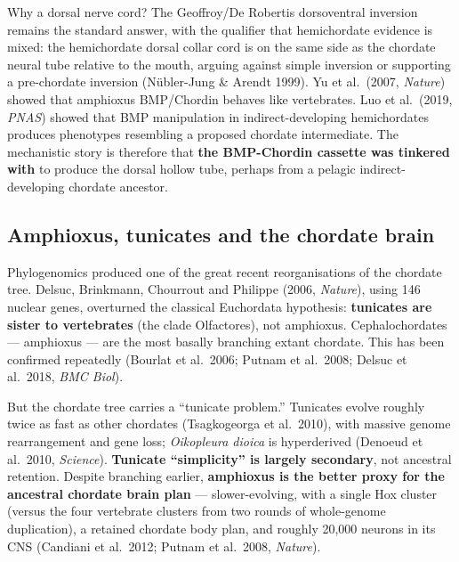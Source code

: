 Why a dorsal nerve cord? The Geoffroy/De Robertis dorsoventral inversion remains the standard answer, with the qualifier that hemichordate evidence is mixed: the hemichordate dorsal collar cord is on the same side as the chordate neural tube relative to the mouth, arguing against simple inversion or supporting a pre-chordate inversion (Nübler-Jung \& Arendt 1999). Yu et al.~(2007, \emph{Nature}) showed that amphioxus BMP/Chordin behaves like vertebrates. Luo et al.~(2019, \emph{PNAS}) showed that BMP manipulation in indirect-developing hemichordates produces phenotypes resembling a proposed chordate intermediate. The mechanistic story is therefore that \textbf{the BMP-Chordin cassette was tinkered with} to produce the dorsal hollow tube, perhaps from a pelagic indirect-developing chordate ancestor.

\subsection{Amphioxus, tunicates and the chordate brain}\label{04_urbilateria-amphioxus-tunicates-and-the-chordate-brain}

Phylogenomics produced one of the great recent reorganisations of the chordate tree. Delsuc, Brinkmann, Chourrout and Philippe (2006, \emph{Nature}), using 146 nuclear genes, overturned the classical Euchordata hypothesis: \textbf{tunicates are sister to vertebrates} (the clade Olfactores), not amphioxus. Cephalochordates --- amphioxus --- are the most basally branching extant chordate. This has been confirmed repeatedly (Bourlat et al.~2006; Putnam et al.~2008; Delsuc et al.~2018, \emph{BMC Biol}).

But the chordate tree carries a ``tunicate problem.'' Tunicates evolve roughly twice as fast as other chordates (Tsagkogeorga et al.~2010), with massive genome rearrangement and gene loss; \emph{Oikopleura dioica} is hyperderived (Denoeud et al.~2010, \emph{Science}). \textbf{Tunicate ``simplicity'' is largely secondary}, not ancestral retention. Despite branching earlier, \textbf{amphioxus is the better proxy for the ancestral chordate brain plan} --- slower-evolving, with a single Hox cluster (versus the four vertebrate clusters from two rounds of whole-genome duplication), a retained chordate body plan, and roughly 20,000 neurons in its CNS (Candiani et al.~2012; Putnam et al.~2008, \emph{Nature}).

